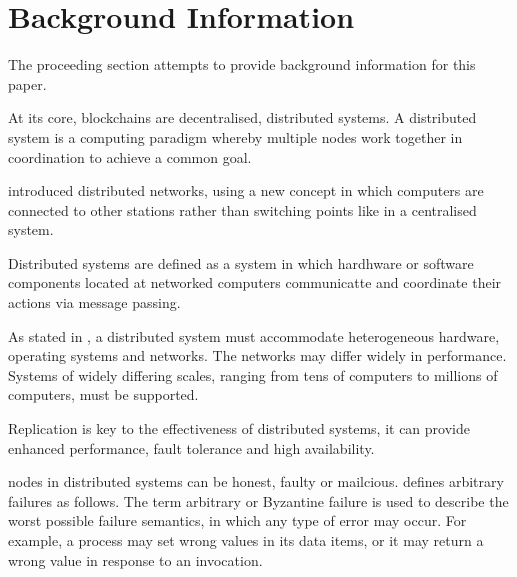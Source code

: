\section{Background Information}
The proceeding section attempts to provide background information for this paper.

At its core, blockchains are decentralised, distributed systems.
A distributed system is a computing paradigm whereby multiple nodes work together in coordination to achieve a common goal. \cite{bashir_mastering_2017}

\cite{baran_distributed_1964} introduced distributed networks, using a new concept in which computers are connected to other stations rather than switching points like in a centralised system.

Distributed systems are defined as a system in which hardhware or software components located at networked computers communicatte and coordinate their actions via message passing. \cite{coulouris_distributed_2011}

As stated in \cite{coulouris_distributed_2011}, a distributed system must accommodate heterogeneous hardware, operating systems and networks. The networks may differ widely in performance. Systems of widely differing scales, ranging from tens of computers to millions of computers, must be supported.

Replication is key to the effectiveness of distributed systems, it can provide enhanced performance, fault tolerance and high availability. \cite{coulouris_distributed_2011}

nodes in distributed systems can be honest, faulty or mailcious. \cite{bashir_mastering_2017}
\cite{coulouris_distributed_2011} defines arbitrary failures as follows. The term arbitrary or Byzantine failure is used to describe the worst possible failure semantics, in which any type of error may occur. 
For example, a process may set wrong values in its data items, or it may return a wrong value in response to an invocation.

